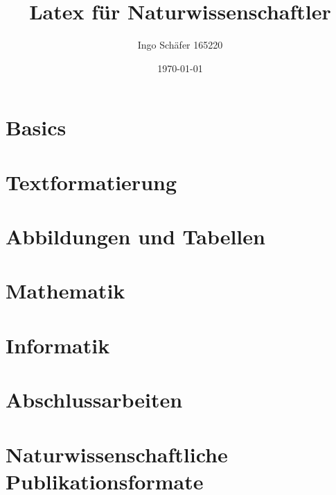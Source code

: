 \documentclass[a4paper,portrait,onecolumn,11pt, titlepage, tableofcontents]{article} %
\title{Latex für Naturwissenschaftler}
\author{Ingo Schäfer 165220}
\date{\today}
\begin{document}


\maketitle

\tableofcontents
\thispagestyle{empty}



\pagebreak
\section{Basics}					%
\label{sec:basics}


\pagebreak
\section{Textformatierung}				%
\label{sec:textformatierung}


\pagebreak
\section{Abbildungen und Tabellen}			%
\label{sec:floats}


\pagebreak
\section{Mathematik}					%
\label{sec:mathematik}


\pagebreak
\section{Informatik}					%
\label{sec:informatik}


\pagebreak
\section{Abschlussarbeiten}				%
\label{sec:abschlussarbeiten}


\pagebreak
\section{Naturwissenschaftliche Publikationsformate}	%


\pagebreak
\listoffigures				%
\listoftables				%

\label{LastPage}
\end{document}
